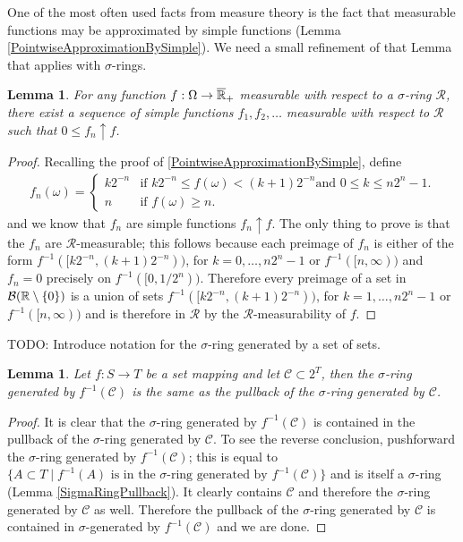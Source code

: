 \documentclass{amsart}
\newtheorem{lem}[thm]{Lemma}
\theoremstyle{remark}
\theoremstyle{definition}
\begin{document}
One of the most often used facts from measure theory is the fact that
measurable functions may be approximated by simple functions (Lemma
\ref{PointwiseApproximationBySimple}).  We need a small refinement of
that Lemma that applies with $\sigma$-rings.
\begin{lem}\label{PointwiseApproximationBySimpleSigmaRing}For any
  function $f : \Omega \to \overline{\mathbb{R}}_+$ 
measurable with respect to a $\sigma$-ring $\mathcal{R}$, there exist a sequence of simple 
  functions $f_1, f_2, \dots$ measurable with respect to $\mathcal{R}$
  such that $0 \leq f_n \uparrow f$.
\end{lem}
\begin{proof}
Recalling the proof of \ref{PointwiseApproximationBySimple}, define
\begin{align*}
f_n(\omega) = 
\begin{cases}k2^{-n} & \text{if $k2^{-n} \leq f(\omega) < (k+1)2^{-n}$
    and $0 \leq k \leq n2^n -1$.} \\
n & \text{if $f(\omega) \geq n$.}
\end{cases}
\end{align*}
and we know that $f_n$ are simple functions $f_n \uparrow f$.  The
only thing to prove is that the $f_n$ are $\mathcal{R}$-measurable;
this follows because each preimage of $f_n$ is either of the form
$f^{-1}([k2^{-n}, (k+1)2^{-n}))$, for $k =0, \dotsc, n2^n -1$ or
$f^{-1}([n, \infty))$ and $f_n=0$ precisely on $f^{-1}([0,1/2^n))$.
Therefore every preimage of a set in $\mathcal{B}(\mathbb{R} \setminus
\lbrace 0 \rbrace)$ is a union of sets $f^{-1}([k2^{-n}, (k+1)2^{-n}))$, for $k =1, \dotsc, n2^n -1$ or
$f^{-1}([n, \infty))$ and is therefore in $\mathcal{R}$ by the
$\mathcal{R}$-measurability of $f$.
\end{proof}

TODO:  Introduce notation for the $\sigma$-ring generated by a
set of sets.

\begin{lem}\label{SigmaRingPullbackGenerators}Let $f : S \to T$ be a set mapping and let $\mathcal{C}
  \subset 2^T$, then the $\sigma$-ring generated by
  $f^{-1}(\mathcal{C})$ is the same as the pullback of the
  $\sigma$-ring generated by $\mathcal{C}$.
\end{lem}
\begin{proof}
It is clear that the $\sigma$-ring generated by $f^{-1}(\mathcal{C})$
is contained in the pullback of the $\sigma$-ring generated by
$\mathcal{C}$.  To see the reverse conclusion, pushforward the
$\sigma$-ring generated by $f^{-1}(\mathcal{C})$; this is equal to
$\lbrace A \subset T \mid f^{-1}(A) \text{ is in the $\sigma$-ring
  generated by } f^{-1}(\mathcal{C})\rbrace$ and is itself a $\sigma$-ring
(Lemma \ref{SigmaRingPullback}).  It clearly contains $\mathcal{C}$ and therefore
the $\sigma$-ring generated by $\mathcal{C}$ as well.  Therefore the
pullback of the $\sigma$-ring generated by $\mathcal{C}$ is contained
in $\sigma$-generated by $f^{-1}(\mathcal{C})$ and we are done.
\end{proof}
\end{document}
